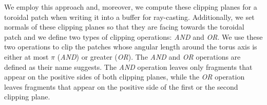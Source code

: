 We employ this approach and, moreover, we compute these clipping planes for a toroidal patch when writing it into a buffer for ray-casting.
Additionally, we set normals of these clipping planes so that they are facing towards the toroidal patch and we define two types of clipping operations: \textit{AND} and \textit{OR}.
We use these two operations to clip the patches whose angular length around the torus axis is either at most $\pi$ (\textit{AND}) or greater (\textit{OR}).
The \textit{AND} and \textit{OR} operations are defined as their name suggests.
The \textit{AND} operation leaves only fragments that appear on the positive sides of both clipping planes, while the \textit{OR} operation leaves fragments that appear on the positive side of the first or the second clipping plane.




